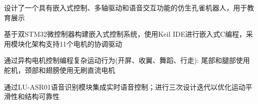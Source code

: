 \begin{cventries}
      {
        设计了一个具有嵌入式控制、多轴驱动和语音交互功能的仿生孔雀机器人，用于教育展示
        \begin{cvitems}
          \item{基于双STM32微控制器构建嵌入式控制系统，使用Keil IDE进行嵌入式C编程，采用模块化架构支持11个电机的协调驱动}
          \item{通过异构电机控制编程复杂运动行为(开屏、收翼、舞蹈、行走): 尾部和腿部使用舵机，颈部和翅膀使用无刷直流电机}
          \item{通过LU-ASR01语音识别模块集成实时语音控制；进行三次设计迭代以优化运动平滑性和结构可靠性}
        \end{cvitems}
      \vspace{4mm}
      }
\end{cventries}